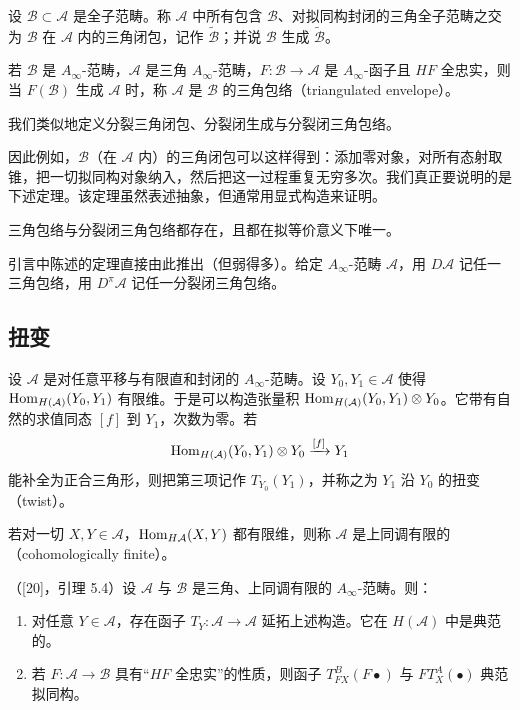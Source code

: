 设 $\mathcal{B}\subset\mathcal{A}$ 是全子范畴。称 $\mathcal{A}$ 中所有包含 $\mathcal{B}$、对拟同构封闭的三角全子范畴之交为 $\mathcal{B}$ 在 $\mathcal{A}$ 内的三角闭包，记作 $\widetilde{\mathcal{B}}$；并说 $\mathcal{B}$ 生成 $\widetilde{\mathcal{B}}$。

若 $\mathcal{B}$ 是 $A_\infty$-范畴，$\mathcal{A}$ 是三角 $A_\infty$-范畴，$F\colon\mathcal{B}\to\mathcal{A}$ 是 $A_\infty$-函子且 $HF$ 全忠实，则当 $F(\mathcal{B})$ 生成 $\mathcal{A}$ 时，称 $\mathcal{A}$ 是 $\mathcal{B}$ 的三角包络（triangulated envelope）。

我们类似地定义分裂三角闭包、分裂闭生成与分裂闭三角包络。

因此例如，$\mathcal{B}$（在 $\mathcal{A}$ 内）的三角闭包可以这样得到：添加零对象，对所有态射取锥，把一切拟同构对象纳入，然后把这一过程重复无穷多次。我们真正要说明的是下述定理。该定理虽然表述抽象，但通常用显式构造来证明。

\begin{theorem}\label{thm:2.4}
三角包络与分裂闭三角包络都存在，且都在拟等价意义下唯一。
\end{theorem}

引言中陈述的定理直接由此推出（但弱得多）。给定 $A_\infty$-范畴 $\mathcal{A}$，用 $D\mathcal{A}$ 记任一三角包络，用 $D^\pi\mathcal{A}$ 记任一分裂闭三角包络。

\subsection{扭变}\label{subsec:ainf-twisting}

设 $\mathcal{A}$ 是对任意平移与有限直和封闭的 $A_\infty$-范畴。设 $Y_0,Y_1\in\mathcal{A}$ 使得 $\operatorname{Hom}_{H(\mathcal{A})}(Y_0,Y_1)$ 有限维。于是可以构造张量积 $\operatorname{Hom}_{H(\mathcal{A})}(Y_0,Y_1)\otimes Y_0$。它带有自然的求值同态 $[f]$ 到 $Y_1$，次数为零。若
\begin{equation}\label{eq:ainf-twist}
\operatorname{Hom}_{H(\mathcal{A})}(Y_0,Y_1)\otimes Y_0\xrightarrow{[f]}Y_1
\end{equation}
能补全为正合三角形，则把第三项记作 $T_{Y_0}(Y_1)$，并称之为 $Y_1$ 沿 $Y_0$ 的扭变（twist）。

若对一切 $X,Y\in\mathcal{A}$，$\operatorname{Hom}_{H\mathcal{A}}(X,Y)$ 都有限维，则称 $\mathcal{A}$ 是上同调有限的（cohomologically finite）。

\begin{proposition}\label{prop:2.5}
（[20]，引理 5.4）设 $\mathcal{A}$ 与 $\mathcal{B}$ 是三角、上同调有限的 $A_\infty$-范畴。则：
\begin{enumerate}[label=\arabic*., leftmargin=2em, itemsep=2pt]
  \item 对任意 $Y\in\mathcal{A}$，存在函子 $T_Y\colon\mathcal{A}\to\mathcal{A}$ 延拓上述构造。它在 $H(\mathcal{A})$ 中是典范的。
  \item 若 $F\colon\mathcal{A}\to\mathcal{B}$ 具有“$HF$ 全忠实”的性质，则函子 $T^B_{FX}(F\bullet)$ 与 $FT^A_X(\bullet)$ 典范拟同构。
\end{enumerate}
\end{proposition}

